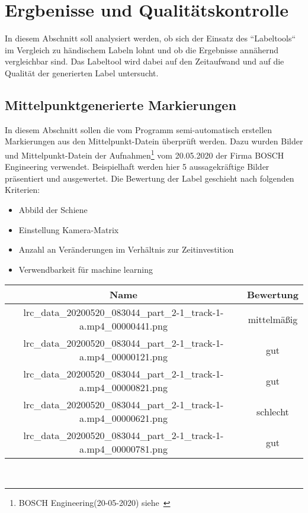\section{Ergbenisse und Qualitätskontrolle}
\label{sec:Ergebnisse und Qualitätskontrolle}

\noindent
In diesem Abschnitt soll analysiert werden, ob sich der Einsatz des ``Labeltools`` im Vergleich zu händischem Labeln lohnt und ob die Ergebnisse annähernd vergleichbar sind. Das Labeltool wird dabei auf den Zeitaufwand und auf die Qualität der generierten Label untersucht.
\noindent
\subsection{Mittelpunktgenerierte Markierungen}
\label{sec:Mittelpunkt Generierung}

\noindent
In diesem Abschnitt sollen die vom Programm semi-automatisch erstellen Markierungen aus den Mittelpunkt-Datein überprüft werden. Dazu wurden Bilder und Mittelpunkt-Datein der Aufnahmen\footnote{BOSCH Engineering(20-05-2020) siehe~\cite{0520}} vom 20.05.2020 der Firma BOSCH Engineering verwendet. Beispielhaft werden hier 5 aussagekräftige Bilder präsentiert und ausgewertet. Die Bewertung der Label geschieht nach folgenden Kriterien:
\\

\noindent
\begin{itemize}
	\item Abbild der Schiene
	\item Einstellung Kamera-Matrix
	\item Anzahl an Veränderungen im Verhältnis zur Zeitinvestition
	\item Verwendbarkeit für machine learning
\end{itemize}

\begin{tabular}[h]{c|c}
Name & Bewertung  \\
\hline
lrc\_data\_20200520\_083044\_part\_2-1\_track-1-a.mp4\_00000441.png & mittelmäßig \\
lrc\_data\_20200520\_083044\_part\_2-1\_track-1-a.mp4\_00000121.png &  gut \\
lrc\_data\_20200520\_083044\_part\_2-1\_track-1-a.mp4\_00000821.png &  gut\\
lrc\_data\_20200520\_083044\_part\_2-1\_track-1-a.mp4\_00000621.png & schlecht  \\
lrc\_data\_20200520\_083044\_part\_2-1\_track-1-a.mp4\_00000781.png & gut  \\
\end{tabular}
\\ 

